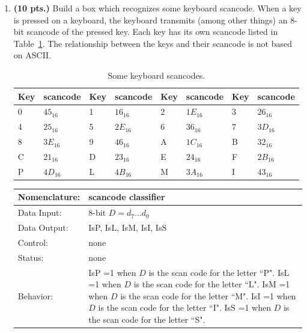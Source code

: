 \begin{enumerate}
The flip box takes the 8-bit data input, flips a single bit identified
by $S$, then sends the new 8-bit value to the output.  
For example, if $D=11110000$ and $S=010$ then
$F=11110100$.  If $D=11110000$ and $S=101$ then $F=11010000$.  The solution
should rely heavily on the basic building blocks.

\begin{solution} {
Arrange 8, 2:1 muxes with $d_i$ and $d_i'$ going into the data inputs.
Run the select into a 3:8 decoder and route the data outputs to the 
individual selects of the 2:1 muxes.
} \end{solution}


\item {\bf (10 pts.)}
\label{page:IsScan}
Build a box which recognizes some keyboard scancode.  When a key is 
pressed on a keyboard, the keyboard transmits (among other things) 
an 8-bit scancode of the pressed key.  Each key has its own scancode 
listed in Table~\ref{table:scancodes}.  The relationship between the 
keys and their scancode is not based on ASCII.

\begin{table}
\begin{tabular}{|l|l||l|l||l|l||l|l|} \hline
Key & scancode & Key & scancode & Key & scancode & Key & scancode \\ \hline \hline 
0 & $45_{16}$ & 1 & $16_{16}$ & 2 & $1E_{16}$ & 3 & $26_{16}$ \\ \hline
4 & $25_{16}$ & 5 & $2E_{16}$ & 6 & $36_{16}$ & 7 & $3D_{16}$ \\ \hline
8 & $3E_{16}$ & 9 & $46_{16}$ & A & $1C_{16}$ & B & $32_{16}$ \\ \hline
C & $21_{16}$ & D & $23_{16}$ & E & $24_{16}$ & F & $2B_{16}$ \\ \hline
P & $4D_{16}$ & L & $4B_{16}$ & M & $3A_{16}$ & I & $43_{16}$ \\ \hline
\end{tabular}
\caption{Some keyboard scancodes.}
\label{table:scancodes}
\end{table}

\label{page:scanclass}
\begin{tabular}{|l|p{3.5in}|} \hline
Nomenclature:  & scancode classifier                   \\ \hline
Data Input:    & 8-bit $D=d_7 \ldots d_0$          \\ \hline
Data Output:   & IsP, IsL, IsM, IsI, IsS \\ \hline
Control:       & none             \\ \hline
Status:        & none                                   \\ \hline
Behavior:      & IsP =1 when $D$ is the scan code for the letter ``P".
		 IsL =1 when $D$ is the scan code for the letter ``L".
		 IsM =1 when $D$ is the scan code for the letter ``M".
		 IsI =1 when $D$ is the scan code for the letter ``I".
		 IsS =1 when $D$ is the scan code for the letter ``S".  \\ \hline
\end{tabular}


\end{enumerate}
